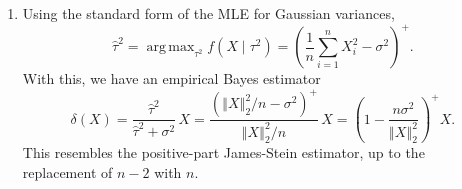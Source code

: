 \documentclass[11pt]{article}
\newcommand{\norm}[1]{\left\Vert #1 \right\Vert}
\DeclareMathOperator*{\argmax}{arg\,max}
\begin{document}
\begin{enumerate}
\begin{enumerate}
            \item Using the standard form of the MLE for Gaussian variances, \[
                \hat{\tau}^2
                    = \argmax_{\tau^2} f(X\mid \tau^2) = \left(\frac{1}{n}\sum_{i = 1}^n X_i^2 - \sigma^2\right)^+.
            \] With this, we have an empirical Bayes estimator \[
                \delta(X)
                    = \frac{\hat{\tau}^2}{\hat{\tau}^2 + \sigma^2}\, X
                    = \frac{\left(\norm{X}_2^2 / n - \sigma^2\right)^+}{\norm{X}_2^2 / n} \, X
                    = \left(1 - \frac{n\sigma^2}{\norm{X}_2^2}\right)^+ X.
            \] This resembles the positive-part James-Stein estimator, up to
            the replacement of $n - 2$ with $n$.
        \end{enumerate}

    \end{enumerate}
\end{document}
